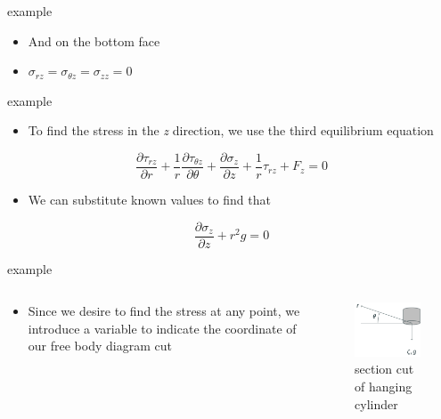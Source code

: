 \documentclass[
  letterpaper,
  ignorenonframetext,
  aspectratio=43,
  handout,
  12pt]{beamer}
\providecommand{\tightlist}{%
  \setlength{\itemsep}{0pt}\setlength{\parskip}{0pt}}
\providecommand{\tightlist}{%
\setlength{\itemsep}{0pt}\setlength{\parskip}{0pt}}
\let\Oldincludegraphics\includegraphics
\renewcommand{\includegraphics}[2][]{\Oldincludegraphics[width=\textwidth,height=0.7\textheight,keepaspectratio]{#2}}
\begin{document}
\begin{frame}{example}
\protect\hypertarget{example-2}{}
\begin{itemize}
\tightlist
\item
  And on the bottom face
\item
  \(\sigma_{rz} = \sigma_{\theta z} = \sigma_{zz} = 0\)
\end{itemize}
\end{frame}

\begin{frame}{example}
\protect\hypertarget{example-3}{}
\begin{itemize}
\tightlist
\item
  To find the stress in the \emph{z} direction, we use the third
  equilibrium equation
\end{itemize}

\[\frac{\partial \tau_{r z}}{\partial r} + \frac{1}{r} \frac{\partial \tau_{\theta z}}{\partial \theta} + \frac{\partial \sigma_z}{\partial z} + \frac{1}{r}\tau_{rz} + F_z = 0\]

\begin{itemize}
\tightlist
\item
  We can substitute known values to find that
\end{itemize}

\[\frac{\partial \sigma_z}{\partial z} + r^2 g = 0\]
\end{frame}

\begin{frame}{example}
\protect\hypertarget{example-4}{}
\begin{columns}[T]
\begin{column}{0.5\textwidth}
\begin{itemize}
\tightlist
\item
  Since we desire to find the stress at any point, we introduce a
  variable to indicate the coordinate of our free body diagram cut
\end{itemize}
\end{column}

\begin{column}{0.5\textwidth}
\begin{figure}
\centering
\includegraphics{../images/11-example-2.svg}
\caption{section cut of hanging cylinder}
\end{figure}
\end{column}
\end{columns}
\end{frame}
\end{document}
